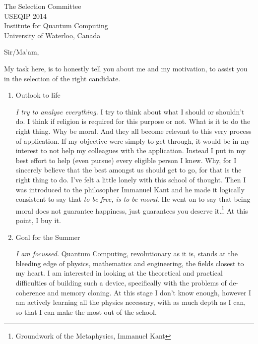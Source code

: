 \documentclass{letter}
\begin{document}

\begin{letter}{The Selection Committee\\USEQIP 2014\\Institute for Quantum Computing\\University of Waterloo, Canada} %


\opening{Sir/Ma'am,}

My task here, is to honestly tell you about me and my motivation, to assist you in the selection of the right candidate. 

\begin{enumerate}
\item Outlook to life

\emph{I try to analyse everything.} I try to think about what I should or shouldn't do. I think if religion is required for this purpose or not. What is it to do the right thing. Why be moral. And they all become relevant to this very process of application. If my objective were simply to get through, it would be in my interest to not help my colleagues with the application. Instead I put in my best effort to help (even pursue) every eligible person I knew. Why, for I sincerely believe that the best amongst us should get to go, for that is the right thing to do. I've felt a little lonely with this school of thought. Then I was introduced to the philosopher Immanuel Kant and he made it logically consistent to say that \emph{to be free, is to be moral}. He went on to say that being moral does not guarantee happiness, just guarantees you deserve it.\footnote{Groundwork of the Metaphysics, Immanuel Kant} At this point, I buy it.

\item Goal for the Summer

\emph{I am focussed.} Quantum Computing, revolutionary as it is, stands at the bleeding edge of physics, mathematics and engineering, the fields closest to my heart. I am interested in looking at the theoretical and practical difficulties of building such a device, specifically with the problems of de-coherence and memory cloning. At this stage I don't know enough, however I am actively learning all the physics necessary, with as much depth as I can, so that I can make the most out of the school.


\end{enumerate}
\end{letter}
\end{document}

